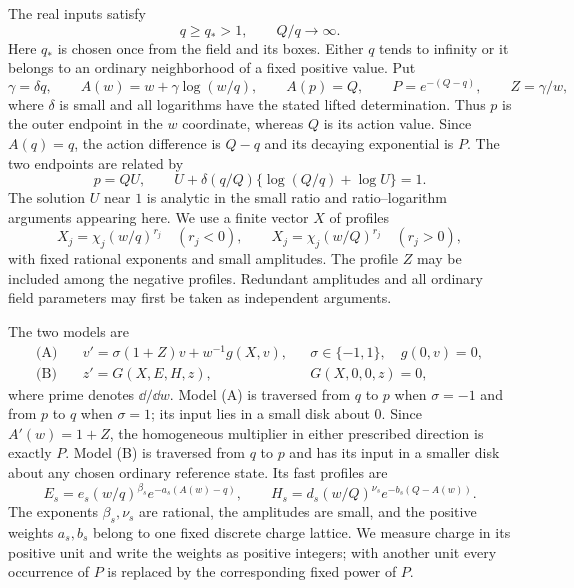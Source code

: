 The real inputs satisfy
\begin{equation}\label{eq:additive-inputs}
 q\ge q_*>1,\qquad Q/q\longrightarrow\infty.
\end{equation}
Here $q_*$ is chosen once from the field and its boxes.  Either $q$ tends
to infinity or it belongs to an ordinary neighborhood of a fixed positive
value.  Put
\begin{equation}\label{eq:additive-clock}
 \gamma=\delta q,\qquad A(w)=w+\gamma\log(w/q),\qquad
 A(p)=Q,\qquad P=e^{-(Q-q)},\qquad Z=\gamma/w,
\end{equation}
where $\delta$ is small and all logarithms have the stated lifted
determination.  Thus $p$ is the outer endpoint in the $w$ coordinate,
whereas $Q$ is its action value.  Since $A(q)=q$, the action difference
is $Q-q$ and its decaying exponential is $P$.  The two endpoints are
related by
\begin{equation}\label{eq:additive-endpoint-unit}
 p=QU,\qquad U+\delta(q/Q)\{\log(Q/q)+\log U\}=1.
\end{equation}
The solution $U$ near $1$ is analytic in the small ratio and
ratio--logarithm arguments appearing here.  We use a finite vector $X$ of
profiles
\begin{equation}\label{eq:additive-profiles}
 X_j=\chi_j(w/q)^{r_j}\quad(r_j<0),\qquad
 X_j=\chi_j(w/Q)^{r_j}\quad(r_j>0),
\end{equation}
with fixed rational exponents and small amplitudes.  The profile $Z$ may
be included among the negative profiles.  Redundant amplitudes and all
ordinary field parameters may first be taken as independent arguments.

The two models are
\begin{align}
 \text{(A)}\quad &v'=\sigma(1+Z)v+w^{-1}g(X,v),
       &&\sigma\in\{-1,1\},\quad g(0,v)=0,\label{eq:additive-A}\\
 \text{(B)}\quad &z'=G(X,E,H,z),
       &&G(X,0,0,z)=0,\label{eq:additive-B}
\end{align}
where prime denotes $\dd/\dd w$.  Model (A) is traversed from $q$ to $p$
when $\sigma=-1$ and from $p$ to $q$ when $\sigma=1$; its input lies in a
small disk about $0$.  Since $A'(w)=1+Z$, the homogeneous multiplier
in either prescribed direction is exactly $P$.  Model (B) is traversed
from $q$ to $p$ and has its input in a smaller disk about any chosen
ordinary reference state.  Its fast profiles are
\begin{equation}\label{eq:additive-fast}
 E_s=e_s(w/q)^{\beta_s}e^{-a_s(A(w)-q)},\qquad
 H_s=d_s(w/Q)^{\nu_s}e^{-b_s(Q-A(w))}.
\end{equation}
The exponents $\beta_s,\nu_s$ are rational, the amplitudes are small, and
the positive weights $a_s,b_s$ belong to one fixed discrete charge lattice.
We measure charge in its positive unit and write the weights as positive
integers; with another unit every occurrence of $P$ is replaced by the
corresponding fixed power of $P$.

